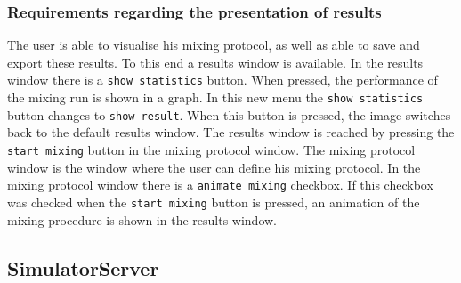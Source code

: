 \subsubsection{Requirements regarding the presentation of results}
The user is able to visualise his mixing protocol, as well as able to save and export these results. To this end a results window is available. In the results window there is a \texttt{show statistics} button. When pressed, the performance of the mixing run is shown in a graph. In this new menu the \texttt{show statistics} button changes to \texttt{show result}. When this button is pressed, the image switches back to the default results window. The results window is reached by pressing the \texttt{start mixing} button in the mixing protocol window. The mixing protocol window is the window where the user can define his mixing protocol. In the mixing protocol window there is a \texttt{animate mixing} checkbox. If this checkbox was checked when the \texttt{start mixing} button is pressed, an animation of the mixing procedure is shown in the results window.





\subsection{SimulatorServer}

